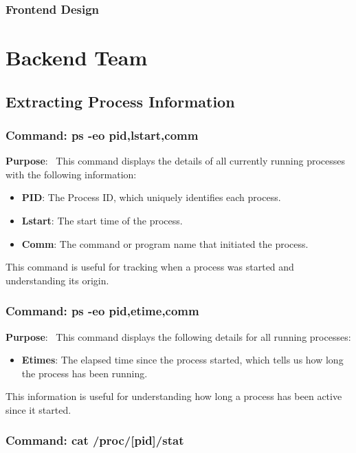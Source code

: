 \documentclass[12pt]{article}
\begin{document}
\subsubsection{Frontend Design}
\section{Backend Team}
\subsection{Extracting Process Information}
\subsubsection{Command: ps -eo pid,lstart,comm}

\textbf{Purpose}: \
This command displays the details of all currently running processes with the following information:

\begin{itemize}
    \item \textbf{PID}: The Process ID, which uniquely identifies each process.
    \item \textbf{Lstart}: The start time of the process.
    \item \textbf{Comm}: The command or program name that initiated the process.
\end{itemize}

This command is useful for tracking when a process was started and understanding its origin.

\subsubsection{Command: ps -eo pid,etime,comm}

\textbf{Purpose}: \
This command displays the following details for all running processes:

\begin{itemize}
    \item \textbf{Etimes}: The elapsed time since the process started, which tells us how long the process has been running.
\end{itemize}

This information is useful for understanding how long a process has been active since it started.

\subsubsection{Command: cat /proc/[pid]/stat}
\end{document}
